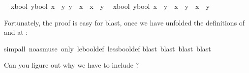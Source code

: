 \begin{isabellebody}
\begin{isamarkuptxt}
\begin{isabelle}
\ {}{\isachardot}\ {\isasymAnd}{\isacharparenleft}x{\isasymColon}bool{\isacharparenright}\ y{\isasymColon}bool{\isachardot}\ {\isasymlbrakk}x\ {\isacharless}{\isacharless}{\isacharequal}\ y{\isacharsemicolon}\ y\ {\isacharless}{\isacharless}{\isacharequal}\ x{\isasymrbrakk}\ {\isasymLongrightarrow}\ x\ {\isacharequal}\ y\isanewline
\ {}{\isachardot}\ {\isasymAnd}{\isacharparenleft}x{\isasymColon}bool{\isacharparenright}\ y{\isasymColon}bool{\isachardot}\ {\isacharparenleft}x\ {\isacharless}{\isacharless}\ y{\isacharparenright}\ {\isacharequal}\ {\isacharparenleft}x\ {\isacharless}{\isacharless}{\isacharequal}\ y\ {\isasymand}\ x\ {\isasymnoteq}\ y{\isacharparenright}%
\end{isabelle}
Fortunately, the proof is easy for blast, once we have unfolded the definitions
of \isa{{\isacharless}{\isacharless}} and \isa{{\isacharless}{\isacharless}{\isacharequal}} at :%
\end{isamarkuptxt}%
simp{\isacharunderscore}all\ {\isacharparenleft}no{\isacharunderscore}asm{\isacharunderscore}use{\isacharparenright}\ only{\isacharcolon}\ le{\isacharunderscore}bool{\isacharunderscore}def\ less{\isacharunderscore}bool{\isacharunderscore}def{\isacharparenright}\isanewline
{}blast{\isacharcomma}\ blast{\isacharcomma}\ blast{\isacharcomma}\ blast{\isacharparenright}%
\begin{isamarkuptext}%
\noindent
Can you figure out why we have to include ?


\end{isamarkuptext}
\end{isabellebody}
